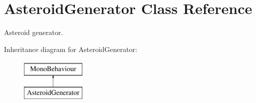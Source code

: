\hypertarget{class_asteroid_generator}{}\section{Asteroid\+Generator Class Reference}
\label{class_asteroid_generator}


Asteroid generator.  


Inheritance diagram for Asteroid\+Generator\+:\begin{figure}[H]
\begin{center}
\leavevmode
\includegraphics[height=2.000000cm]{class_asteroid_generator}
\end{center}
\end{figure}
